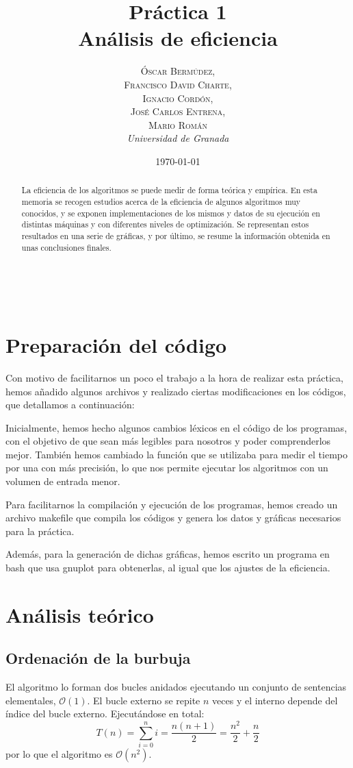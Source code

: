 \documentclass[a4paper, 11pt]{article} %
\title{\textbf{Práctica 1}\\ %
Análisis de eficiencia} %
\author{\textsc{Óscar Bermúdez,\\Francisco David Charte,\\Ignacio Cordón,\\José Carlos Entrena,\\Mario Román} %
\\{\textit{Universidad de Granada}}} %
\date{\today} %
\makeatletter
\renewcommand{\maketitle}{ %
\begin{flushright} %
{\LARGE\@title} %

\vspace{50pt} %

{\large\@author} %
\\\@date %

\vspace{40pt} %
\end{flushright}
}
\makeatother
\begin{document}
\maketitle %

\begin{abstract}
La eficiencia de los algoritmos se puede medir de forma teórica 
y empírica. En esta memoria se recogen estudios acerca de la 
eficiencia de algunos algoritmos muy conocidos, y se exponen 
implementaciones de los mismos y datos de su ejecución en 
distintas máquinas y con diferentes niveles de optimización.
Se representan estos resultados en una serie de gráficas, y por 
último, se resume la información obtenida en unas conclusiones 
finales.
\end{abstract}
\tableofcontents

\pagebreak

\section {Preparación del código}
Con motivo de facilitarnos un poco el trabajo a la hora de realizar esta práctica,
hemos añadido algunos archivos y realizado ciertas modificaciones en los códigos, que
detallamos a continuación: 

\medskip
Inicialmente, hemos hecho algunos cambios léxicos en el código de los programas, con el
objetivo de que sean más legibles para nosotros y poder comprenderlos mejor. También hemos
cambiado la función que se utilizaba para medir el tiempo por una con más precisión, lo 
que nos permite ejecutar los algoritmos con un volumen de entrada menor. 

Para facilitarnos la compilación y ejecución de los programas, hemos creado un archivo 
makefile que compila los códigos y genera los datos y gráficas necesarios para la práctica.

Además, para la generación de dichas gráficas, hemos escrito un programa en bash que usa gnuplot 
para obtenerlas, al igual que los ajustes de la eficiencia. 

\section {Análisis teórico}
\subsection {Ordenación de la burbuja}
El algoritmo lo forman dos bucles anidados ejecutando un conjunto de sentencias elementales, $\mathcal{O}(1)$.
El bucle externo se repite $n$ veces y el interno depende del índice del bucle externo. Ejecutándose en total:
\begin{equation}
 T(n) = \sum_{i=0}^n i = \frac{n(n+1)}{2} = \frac{n^2}{2} + \frac{n}{2}
\end{equation}
por lo que el algoritmo es $\mathcal{O}(n^2)$.
\end{document}
